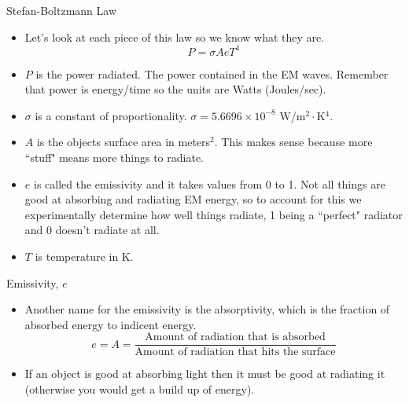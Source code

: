 \documentclass{beamer}
\begin{document}
\begin{frame}{Stefan-Boltzmann Law}
\begin{itemize}
   \item Let's look at each piece of this law so we know what they are.
   \begin{equation*}
      P = \sigma A e T^4
   \end{equation*}
   \item<2> \underline{$P$} is the power radiated. The power contained in the EM waves. Remember that power is energy/time so the units are Watts (Joules/sec).
   \item<3> \underline{$\sigma$} is a constant of proportionality. $\sigma = 5.6696 \times 10^{-8}$ W/m$^2\cdot$K$^4$.
   \item<4> \underline{$A$} is the objects surface area in meters$^2$. This makes sense because more ``stuff" means more things to radiate.
   \item<5> \underline{$e$} is called the emissivity and it takes values from 0 to 1. Not all things are good at absorbing and radiating EM energy, so to account for this we experimentally determine how well things radiate, 1 being a ``perfect" radiator and 0 doesn't radiate at all.
   \item<6> \underline{$T$} is temperature in K.
\end{itemize}
\end{frame}

\begin{frame}{Emissivity, $e$}
\begin{itemize}
   \item Another name for the emissivity is the absorptivity, which is the fraction of absorbed energy to indicent energy.
   \begin{equation*}
      e = A = \frac{\text{Amount of radiation that is absorbed}}{\text{Amount of radiation that hits the surface}}
   \end{equation*}
   \item<2> If an object is good at absorbing light then it must be good at radiating it (otherwise you would get a build up of energy).
\end{itemize}
\end{frame}
\end{document}
